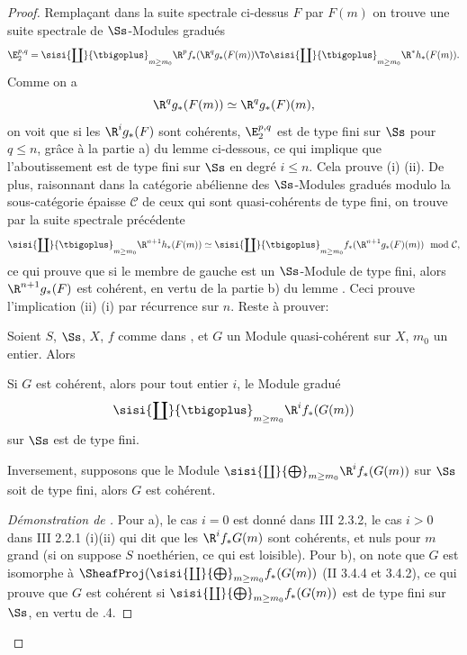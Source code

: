 \begin{proof}
Rempla\c cant dans la suite spectrale ci-dessus $F$ par $F(m)$ on
trouve une suite spectrale de $\Ss$-Modules gradu\'es\pageoriginale
\[
\E_2^{p, q}= \sisi{\coprod}{\tbigoplus}_{m\geq m_0} \R^pf_\ast(\R^qg_\ast(F(m)) \To \sisi{\coprod}{\tbigoplus}_{m\geq m_0} \R^\ast h_\ast(F(m)).
\]
Comme on a
\[
\R^qg_\ast(F(m)) \simeq \R^qg_\ast(F) (m),
\]
on voit que si les $\R^ig_\ast(F)$ sont coh\'erents, $\E_2^{p, q}$ est de type fini sur $\Ss$ pour $q\leq n$, gr\^ace \`a la partie a) du lemme  ci-dessous, ce qui implique que l'aboutissement est de type fini sur $\Ss$ en degr\'e $i\leq n$. Cela prouve (i) \ALORS (ii). De plus, raisonnant dans la cat\'egorie ab\'elienne des $\Ss$-Modules gradu\'es modulo la sous-cat\'egorie \'epaisse $\mathcal{C}$ de ceux qui sont quasi-coh\'erents de type fini, on trouve par la suite spectrale pr\'ec\'edente
\[
\sisi{\coprod}{\tbigoplus}_{m\geq m_0} \R^{n+1} h_\ast(F(m)) \simeq \sisi{\coprod}{\tbigoplus}_{m\geq m_0} f_\ast (\R^{n+1} g_\ast(F)(m)) \mod \mathcal{C},
\]
ce qui prouve que si le membre de gauche est un $\Ss$-Module de type fini, alors $\R^{n+1} g_\ast(F)$ est coh\'erent, en vertu de la partie b) du lemme . Ceci prouve l'implication (ii) \ALORS (i) par r\'ecurrence sur $n$. Reste \`a prouver:

\begin{lemme} \label{XII.5.3} Soient $S$, $\Ss$, $X$, $f$ comme dans , et $G$ un Module quasi-coh\'erent sur $X$, $m_0$ un entier. Alors
\begin{enumeratea}
\item
Si $G$ est coh\'erent, alors pour tout entier $i$, le Module gradu\'e
\[
\sisi{\coprod}{\tbigoplus}_{m\geq m_0} \R^i f_\ast(G(m))
\]
sur $\Ss$ est de type fini.
\item
Inversement, supposons que le Module $\sisi{\coprod}{\bigoplus}_{m\geq m_0} \R^i f_\ast(G(m))$ sur $\Ss$ soit de type fini, alors $G$ est coh\'erent.
\end{enumeratea}
\end{lemme}

\begin{proof}[D\'emonstration de ]
Pour a), le cas $i=0$ est donn\'e dans \EGA III 2.3.2, le cas $i>0$ dans \EGA III 2.2.1 (i)(ii) qui dit que les $ \R^i f_\ast G(m)$ sont coh\'erents\pageoriginale, et nuls pour $m$ grand (si on suppose $S$ noeth\'erien, ce qui est loisible). Pour b), on note que $G$ est isomorphe \`a $\SheafProj (\sisi{\coprod}{\bigoplus}_{m\geq m_0}f_\ast(G(m))$ (\EGA II 3.4.4 et 3.4.2), ce qui prouve que $G$ est coh\'erent si $\sisi{\coprod}{\bigoplus}_{m\geq m_0}f_\ast(G(m))$ est de type fini sur $\Ss$, en vertu de .4.
\skipqed
\end{proof}
\skipqed
\end{proof}

